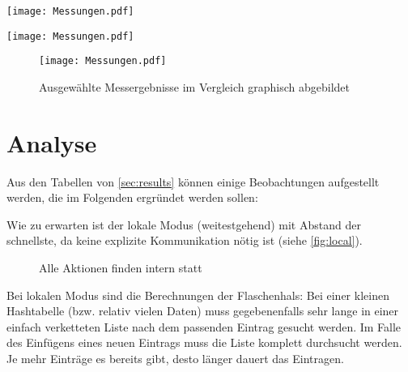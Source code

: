 \documentclass{scrreprt}
\begin{document}
\begin{table}[!ht]
\centering
\texttt{[image: Messungen.pdf]}
\caption{Messergebnisse im Modus \lstinline|distributed| mit 32 Maschinen}
\label{tab:dist32}
\end{table}

\begin{table}[!ht]
\centering
\texttt{[image: Messungen.pdf]}
\caption{Messergebnisse im Modus \lstinline|distributed| mit 42 Maschinen}
\label{tab:dist42}
\end{table}

\begin{figure}[!ht]
\centering
\texttt{[image: Messungen.pdf]}
\caption{Ausgewählte Messergebnisse im Vergleich graphisch abgebildet}
\label{tab:graphs}
\end{figure}

\clearpage

\section{Analyse}

Aus den Tabellen von \autoref{sec:results} können einige Beobachtungen aufgestellt werden, die im Folgenden ergründet werden sollen:\bigskip

Wie zu erwarten ist der lokale Modus (weitestgehend) mit Abstand der schnellste, da keine explizite Kommunikation nötig ist (siehe \autoref{fig:local}). %
\begin{figure}[!ht]
\centering
{}
\caption{Alle Aktionen finden intern statt}
\label{fig:local}
\end{figure}%
Bei lokalen Modus sind die Berechnungen der Flaschenhals: Bei einer kleinen Hashtabelle (bzw. relativ vielen Daten) muss gegebenenfalls sehr lange in einer einfach verketteten Liste nach dem passenden Eintrag gesucht werden. Im Falle des Einfügens eines neuen Eintrags muss die Liste komplett durchsucht werden. Je mehr Einträge es bereits gibt, desto länger dauert das Eintragen. \bigskip
\end{document}
